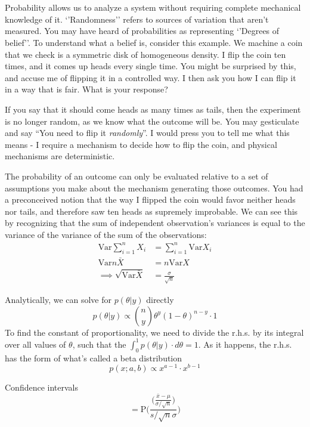 \documentclass[11pt,a4paper,article]{memoir} %
\begin{document}
\newpage
\appendix
\chapter{}
Probability allows us to analyze a system without requiring complete mechanical knowledge of it. `'Randomness'' refers to sources of variation that aren't measured. You may have heard of probabilities as representing `'Degrees of belief''. To understand what a belief is, consider this example. We machine a coin that we check is a symmetric disk of homogeneous density. I flip the coin ten times, and it comes up heads every single time. You might be surprised by this, and accuse me of flipping it in a controlled way. I then ask you how I can flip it in a way that is fair. What is your response?
\par
If you say that it should come heads as many times as tails, then the experiment is no longer random, as we know what the outcome will be. You may gesticulate and say ``You need to flip it \emph{randomly}''. I would press you to tell me what this means - I require a mechanism to decide how to flip the coin, and physical mechanisms are deterministic.
\par
The probability of an outcome can only be evaluated relative to a set of assumptions you make about the mechanism generating those outcomes. You had a preconceived notion that the way I flipped the coin would favor neither heads nor tails, and therefore saw ten heads as supremely improbable.
\newpage
We can see this by recognizing that the sum of independent observation's variances is equal to the variance of the variance of the sum of the observations:
\begin{align}
 \text{Var}\sum_{i = 1}^n X_i &= \sum_{i = 1}^n \text{Var}X_i\\
	\text{Var}n\bar{X} &= n\text{Var}X \\
	\implies \sqrt{\text{Var}\bar{X}} &= \frac{\sigma}{\sqrt{n}}
\end{align}
\par
Analytically, we can solve for $p(\theta|y)$ directly
\[
  p(\theta|y) \propto \binom{n}{y}\theta^y (1 - \theta)^{n-y}\cdot 1
\]
To find the constant of proportionality, we need to divide the r.h.s. by its integral over all values of $\theta$, such that the $\int_0^1 p(\theta|y)\cdot d\theta = 1$. As it happens, the r.h.s. has the form of what's called a beta distribution
\[
  p(x; a, b) \propto x^{a - 1}\cdot x^{b-1}
\]

Confidence intervals
\[
	 = \text{P}\Bigg(\frac{\Big(\frac{\bar{x} - \mu}{\sigma/\sqrt{n}}\Big)}{s/\sqrt{n}\sigma}\Bigg)
\]
\end{document}
